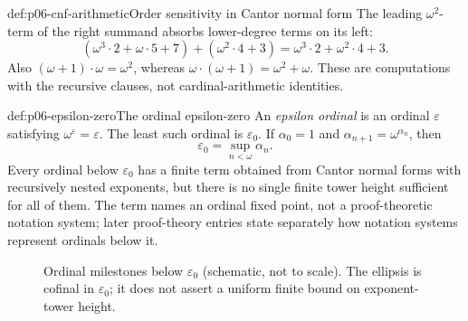 \begin{hbexample}{def:p06-cnf-arithmetic}{Order sensitivity in Cantor normal form}
The leading \(\omega^2\)-term of the right summand absorbs lower-degree terms
on its left:
\[
 (\omega^3\cdot2+\omega\cdot5+7)
 +(\omega^2\cdot4+3)
 =\omega^3\cdot2+\omega^2\cdot4+3.
\]
Also \((\omega+1)\cdot\omega=\omega^2\), whereas
\(\omega\cdot(\omega+1)=\omega^2+\omega\).  These are computations with the
recursive clauses, not cardinal-arithmetic identities.
\end{hbexample}

\begin{hbdefinition}{def:p06-epsilon-zero}{The ordinal epsilon-zero}
An \emph{epsilon ordinal} is an ordinal \(\varepsilon\) satisfying
\(\omega^\varepsilon=\varepsilon\).  The least such ordinal is
\(\varepsilon_0\).  If \(\alpha_0=1\) and
\(\alpha_{n+1}=\omega^{\alpha_n}\), then
\[
 \varepsilon_0=\sup_{n<\omega}\alpha_n.
\]
Every ordinal below \(\varepsilon_0\) has a finite term obtained from Cantor
normal forms with recursively nested exponents, but there is no single finite
tower height sufficient for all of them.  The term names an ordinal fixed
point, not a proof-theoretic notation system; later proof-theory entries state
separately how notation systems represent ordinals below it.
\end{hbdefinition}

\begin{figure}[htbp]
\centering
{}
\caption{Ordinal milestones below \(\varepsilon_0\) (schematic, not to scale).
The ellipsis is cofinal in \(\varepsilon_0\); it
does not assert a uniform finite bound on exponent-tower height.}
\label{fig:p06-ordinals-epsilon-zero}
\end{figure}

